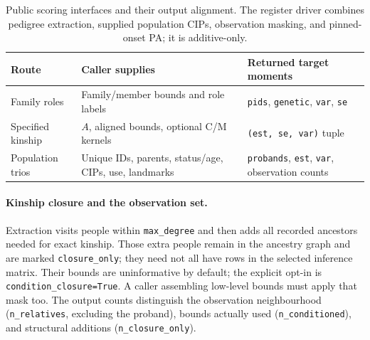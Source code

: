 \documentclass[11pt,a4paper]{article}
\begin{document}
\begin{table}[ht]
\centering
\caption{Public scoring interfaces and their output alignment.
The register driver combines pedigree extraction, supplied population
CIPs, observation masking, and pinned-onset PA; it is additive-only.}
\label{tab:interfaces}
\small
\begin{tabular}{@{}>{\raggedright\arraybackslash}p{2.8cm}
  >{\raggedright\arraybackslash}p{6.4cm}
  >{\raggedright\arraybackslash}p{5.6cm}@{}}
\toprule
Route & Caller supplies & Returned target moments \\
\midrule
Family roles & Family/member bounds and role labels &
  \texttt{pids}, \texttt{genetic}, \texttt{var}, \texttt{se} \\
Specified kinship & $A$, aligned bounds, optional C/M kernels &
  \texttt{(est, se, var)} tuple \\
Population trios & Unique IDs, parents, status/age, CIPs, use, landmarks &
  \texttt{probands}, \texttt{est}, \texttt{var}, observation counts \\
\bottomrule
\end{tabular}
\end{table}

\paragraph{Kinship closure and the observation set.}
Extraction visits people within \texttt{max\_degree} and then adds all
recorded ancestors needed for exact kinship. Those extra people remain in
the ancestry graph and are marked \texttt{closure\_only}; they need not all
have rows in the selected inference matrix. Their bounds are uninformative
by default; the explicit opt-in is \texttt{condition\_closure=True}.
A caller assembling low-level bounds must apply that mask too.
The output counts distinguish the observation neighbourhood
(\texttt{n\_relatives}, excluding the proband), bounds actually used
(\texttt{n\_conditioned}), and structural additions
(\texttt{n\_closure\_only}).
\end{document}
